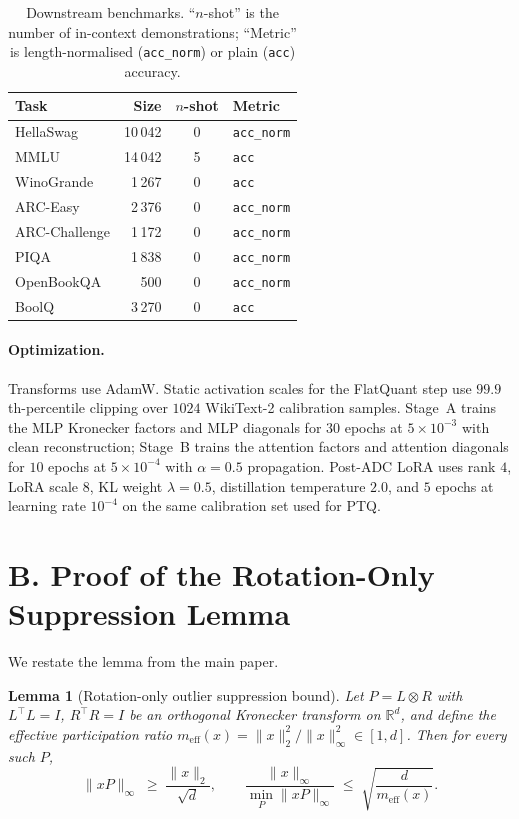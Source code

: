\documentclass[letterpaper]{article} %
\theoremstyle{plain}
\newtheorem{lemma}{Lemma}
\begin{document}
\begin{table}[htbp]
\centering
\small
\setlength{\tabcolsep}{4pt}
\begin{tabular}{@{}l r c l@{}}
\toprule
\textbf{Task} & \textbf{Size} & \textbf{$n$-shot} & \textbf{Metric} \\
\midrule
HellaSwag      & 10\,042 & 0 & \texttt{acc\_norm}  \\
MMLU           & 14\,042 & 5 & \texttt{acc}  \\
WinoGrande     &  1\,267 & 0 & \texttt{acc}        \\
ARC-Easy       &  2\,376 & 0 & \texttt{acc\_norm} \\
ARC-Challenge  &  1\,172 & 0 & \texttt{acc\_norm}  \\
PIQA           &  1\,838 & 0 & \texttt{acc\_norm} \\
OpenBookQA     &    500  & 0 & \texttt{acc\_norm}  \\
BoolQ          &  3\,270 & 0 & \texttt{acc}     \\
\bottomrule
\end{tabular}
\caption{Downstream benchmarks. ``$n$-shot'' is the number of in-context demonstrations; ``Metric'' is length-normalised (\texttt{acc\_norm}) or plain (\texttt{acc}) accuracy.}
\label{tab:lm_eval_tasks}
\end{table}

\paragraph{Optimization.}
Transforms use AdamW. Static activation scales for the FlatQuant step use $99.9$th-percentile clipping over $1024$ WikiText-2 calibration samples. Stage~A trains the MLP Kronecker factors and MLP diagonals for $30$ epochs at $5\times10^{-3}$ with clean reconstruction; Stage~B trains the attention factors and attention diagonals for $10$ epochs at $5\times10^{-4}$ with $\alpha = 0.5$ propagation. Post-ADC LoRA uses rank $4$, LoRA scale $8$, KL weight $\lambda = 0.5$, distillation temperature $2.0$, and $5$ epochs at learning rate $10^{-4}$ on the same calibration set used for PTQ.

\section{B. Proof of the Rotation-Only Suppression Lemma}

We restate the lemma from the main paper.

\begin{lemma}[Rotation-only outlier suppression bound]
\label{lem:rotation}
Let $P = L \otimes R$ with $L^\top L = I$, $R^\top R = I$ be an orthogonal Kronecker transform on $\mathbb{R}^d$, and define the effective participation ratio $m_{\mathrm{eff}}(x) = \|x\|_2^2 / \|x\|_\infty^2 \in [1, d]$. Then for every such $P$,
\begin{equation}
    \|xP\|_\infty \;\ge\; \frac{\|x\|_2}{\sqrt{d}},\qquad
    \frac{\|x\|_\infty}{\min_{P}\|xP\|_\infty} \;\le\; \sqrt{\frac{d}{m_{\mathrm{eff}}(x)}} .
\end{equation}
\end{lemma}
\end{document}
